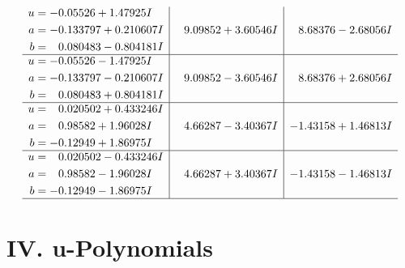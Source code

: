 \documentclass[1p]{elsarticle_modified}
\theoremstyle{definition}
\begin{document}
$$\begin{array}{c|c|c}
\begin{aligned}
u &= -0.05526 + 1.47925 I \\
a &= -0.133797 + 0.210607 I \\
b &= \phantom{-}0.080483 - 0.804181 I\end{aligned}
 & \phantom{-}9.09852 + 3.60546 I & \phantom{-}8.68376 - 2.68056 I \\ \hline\begin{aligned}
u &= -0.05526 - 1.47925 I \\
a &= -0.133797 - 0.210607 I \\
b &= \phantom{-}0.080483 + 0.804181 I\end{aligned}
 & \phantom{-}9.09852 - 3.60546 I & \phantom{-}8.68376 + 2.68056 I \\ \hline\begin{aligned}
u &= \phantom{-}0.020502 + 0.433246 I \\
a &= \phantom{-}0.98582 + 1.96028 I \\
b &= -0.12949 + 1.86975 I\end{aligned}
 & \phantom{-}4.66287 - 3.40367 I & -1.43158 + 1.46813 I \\ \hline\begin{aligned}
u &= \phantom{-}0.020502 - 0.433246 I \\
a &= \phantom{-}0.98582 - 1.96028 I \\
b &= -0.12949 - 1.86975 I\end{aligned}
 & \phantom{-}4.66287 + 3.40367 I & -1.43158 - 1.46813 I\\
 \hline 
 \end{array}$$\newpage
\newpage\renewcommand{\arraystretch}{1}
\centering \section*{ IV. u-Polynomials}
\end{document}
